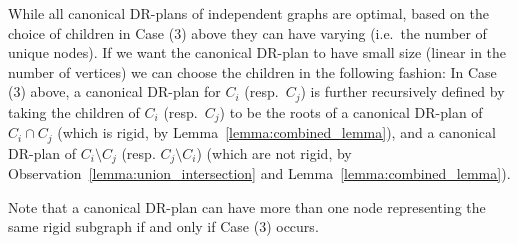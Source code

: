 \begin{observation}
    While all canonical DR-plans of independent graphs are optimal, based on the choice of children in Case (3) above they can have varying  (i.e.\ the number of unique nodes). If we want the canonical DR-plan to have small size (linear  in the number of vertices) we can choose the children in the following fashion: In Case (3) above, a canonical DR-plan for $C_i$ (resp.\ $C_j$) is further recursively defined by taking the children of $C_i$ (resp.\ $C_j$) to be the roots of a canonical DR-plan of $C_i\cap C_j$ (which is rigid, by Lemma~\ref{lemma:combined_lemma}), and a canonical DR-plan of $C_i\setminus C_j$ (resp. $C_j\setminus C_i$) (which are not rigid, by Observation~\ref{lemma:union_intersection} and Lemma~\ref{lemma:combined_lemma}).

    Note that a canonical DR-plan can have more than one node representing the same rigid subgraph if and only if Case (3) occurs.
\end{observation}







